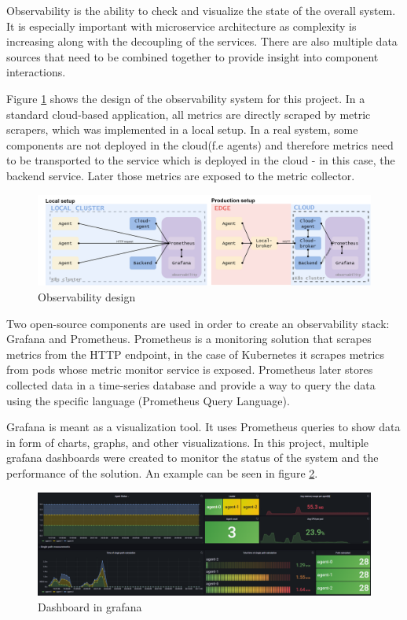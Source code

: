 Observability is the ability to check and visualize the state of the overall system. It is especially important with microservice architecture as complexity is increasing along with the decoupling of the services. There are also multiple data sources that need to be combined together to provide insight into component interactions. 

Figure \ref{fig:observability_system} shows the design of the observability system for this project. In a standard cloud-based application, all metrics are directly scraped by metric scrapers, which was implemented in a local setup. In a real system, some components are not deployed in the cloud(f.e agents) and therefore metrics need to be transported to the service which is deployed in the cloud - in this case, the backend service. Later those metrics are exposed to the metric collector.

\begin{figure}[H]
    \centering
    \includegraphics[width=\textwidth]{pictures/observability.png}
    \caption{ Observability design }
    \label{fig:observability_system}
\end{figure}

Two open-source components are used in order to create an observability stack: Grafana and Prometheus. Prometheus is a monitoring solution that scrapes metrics from the HTTP endpoint, in the case of Kubernetes it scrapes metrics from pods whose metric monitor service is exposed. Prometheus later stores collected data in a time-series database and provide a way to query the data using the specific language (Prometheus Query Language)\cite{prometheus_docs}.

Grafana is meant as a visualization tool. It uses Prometheus queries to show data in form of charts, graphs, and other visualizations. In this project, multiple grafana dashboards were created to monitor the status of the system and the performance of the solution. An example can be seen in figure \ref{fig:dashboard_grafana}.

\begin{figure}[H]
    \centering
    \includegraphics[width=\textwidth]{pictures/grafana.png}
    \caption{ Dashboard in grafana }
    \label{fig:dashboard_grafana}
\end{figure}

